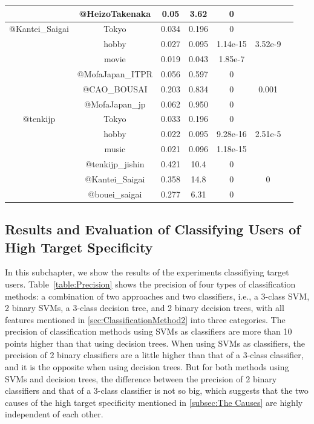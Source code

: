 \begin{table}[t]
\begin{center}
{\begin{tabular}{ccccccc}
 & @HeizoTakenaka & 0.05 & 3.62 & 0 & \\ \hline
 @Kantei\_Saigai & Tokyo & 0.034 & 0.196 & 0 & \\
 & hobby & 0.027 & 0.095 & 1.14e-15 & 3.52e-9 \\
 & movie & 0.019 & 0.043 & 1.85e-7 & \\ \cline{2-7}
 & @MofaJapan\_ITPR & 0.056 & 0.597 & 0 & \\
 & @CAO\_BOUSAI & 0.203 & 0.834 & 0 & 0.001 \\
 & @MofaJapan\_jp & 0.062 & 0.950 & 0 & \\ \hline
 @tenkijp & Tokyo & 0.033 & 0.196 & 0 & \\
 & hobby & 0.022 & 0.095 & 9.28e-16 & 2.51e-5 \\
 & music & 0.021 & 0.096 & 1.18e-15 & \\ \cline{2-7}
 & @tenkijp\_jishin & 0.421 & 10.4 & 0  & \\
 & @Kantei\_Saigai & 0.358 & 14.8 & 0 & 0 \\
 & @bouei\_saigai & 0.277 & 6.31 & 0 & \\ \hline
\end{tabular}
}
\end{center}
\end{table}

\subsection{Results and Evaluation of Classifying Users of High Target
  Specificity}
\label{subsec:Results of Method2}

In this subchapter, we show the results of the experiments classifiying
target users.  Table~\ref{table:Precision} shows the precision of four
types of classification methods: a combination of two approaches and two
classifiers, i.e., a 3-class SVM, 2 binary SVMs, a 3-class decision
tree, and 2 binary decision trees, with all features mentioned in
\ref{sec:ClassificationMethod2} into three categories.  The precision
of classification methods using SVMs as classifiers are more than 10
points higher than that using decision trees.  When using SVMs as
classifiers, the precision of 2 binary classifiers are a little higher
than that of a 3-class classifier, and it is the opposite when using
decision trees.  But for both methods using SVMs and decision trees, the
difference between the precision of 2 binary classifiers and that of a
3-class classifier is not so big, which suggests that the two causes of
the high target specificity mentioned in \ref{subsec:The Causes} are
highly independent of each other.

